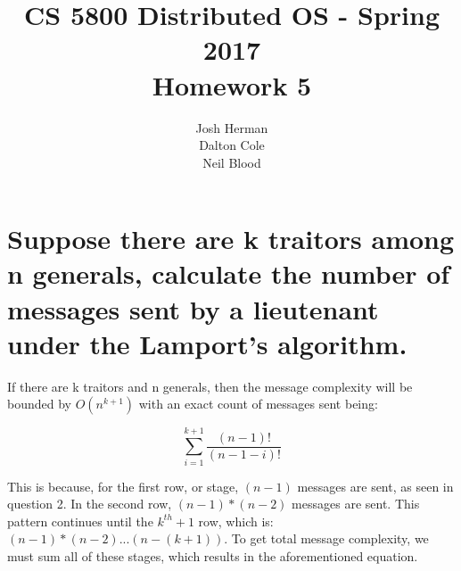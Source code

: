 \documentclass[times]{article}
\begin{document}
	\title{CS 5800 Distributed OS - Spring 2017 \\ Homework 5}
	\author{Josh Herman \\ Dalton Cole \\ Neil Blood}
	\date{}
	\maketitle

	\section{Suppose there are k traitors among n generals, calculate the number of messages sent by a lieutenant under the Lamport’s algorithm.}
		If there are k traitors and n generals, then the message complexity will be bounded by $O(n^{k+1})$ with an exact count of messages sent being:

		\begin{equation*}
			\sum_{i=1}^{k+1} \frac{(n-1)!}{(n-1-i)!}
		\end{equation*}

		This is because, for the first row, or stage, $(n-1)$ messages are sent, as seen in question 2. In the second row, $(n-1)*(n-2)$ messages are sent. This pattern continues until the $k^{th} + 1$ row, which is: $(n-1)*(n-2)...(n-(k+1))$. To get total message complexity, we must sum all of these stages, which results in the aforementioned equation.
	

	
	
		
\end{document}
